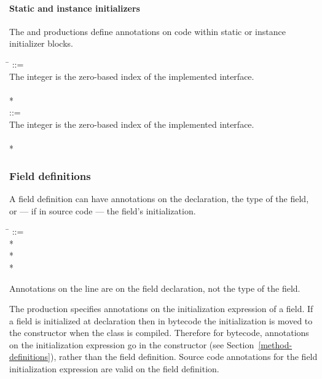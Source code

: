 \documentclass{article}
\begin{document}
\paragraph{Static and instance initializers}

The  and  productions
define annotations on code within static or instance initializer blocks.

\begin{tabbing}
\qquad \= \kill
{} ::= \\
\qquad    \bnfcmt The integer is the zero-based index of the implemented interface. \\
\qquad    {} \bnflit{*}  \bnflit{:} \lineend  \\
\qquad        {}*
\\
 ::= \\
\qquad    \bnfcmt The integer is the zero-based index of the implemented interface. \\
\qquad    {} \bnflit{*}  \bnflit{:} \lineend  \\
\qquad        {}*
\end{tabbing}


\subsubsection{Field definitions\label{field-definitons}}

A field definition can have annotations on the declaration, the type of the
field, or --- if in source code --- the field's initialization.

\begin{tabbing}
\qquad \= \kill
{} ::= \\
\qquad    {}  \bnflit{:} * \lineend \\
\qquad        {}* \\
\qquad        {}*
\end{tabbing}

\noindent
Annotations on the  line are on the field declaration, not the
type of the field.

The  production specifies annotations on the
initialization expression of a field. If a field is initialized at declaration
then in bytecode the initialization is moved to the constructor when the class
is compiled. Therefore for bytecode, annotations on the initialization
expression go in the constructor (see Section~\ref{method-definitions}), rather
than the field definition. Source code annotations for the field initialization
expression are valid on the field definition.
\end{document}
